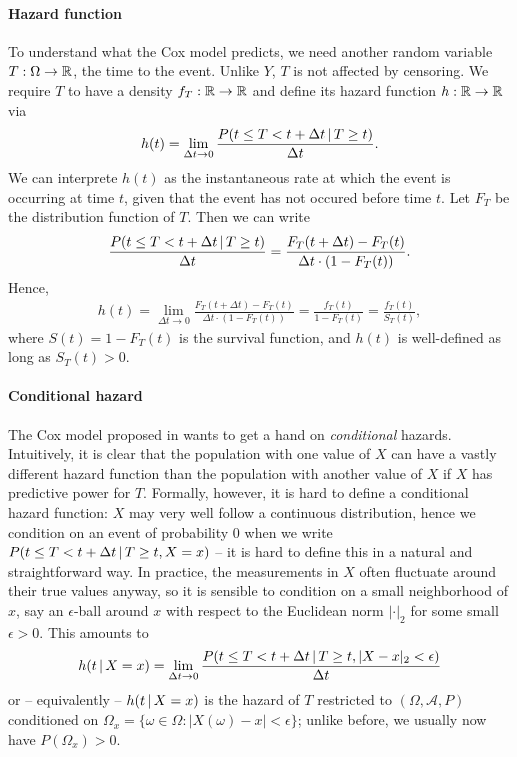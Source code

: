 \paragraph{Hazard function} To understand what the Cox model predicts, we need another random 
variable $T: \Omega \to \mathbb{R}$, the time to the event. Unlike $Y$, $T$ is not affected by censoring. 
We require $T$ to have a density $f_T: \mathbb{R} \to \mathbb{R}$ and define its hazard function $h: \mathbb{R} \to \mathbb{R}$
via
\begin{align}
    h(t) = \lim_{\Delta t \to 0} \frac{P(t \leq T < t + \Delta t \,|\, T \geq t)}{\Delta t}.
\end{align}
We can interprete $h(t)$ as the instantaneous rate at which the event is occurring at time $t$, 
given that the event has not occured before time $t$. Let $F_T$ be the distribution function of 
$T$. Then 
we can write
\begin{align}
    \frac{P(t \leq T < t + \Delta t \,|\, T \geq t)}{\Delta t} = 
    \frac{F_T(t + \Delta t) - F_T(t)}{\Delta t \cdot (1 - F_T(t))}.
\end{align}
Hence, 
\begin{align}
    h(t) = \lim_{\Delta t \to 0} \frac{F_T(t + \Delta t) - F_T(t)}{\Delta t \cdot (1 - F_T(t))} 
    = \frac{f_T(t)}{1 - F_T(t)} = \frac{f_T(t)}{S_T(t)},
\end{align}
where $S(t) = 1 - F_T(t)$ is the survival function, and $h(t)$ is well-defined as long as $S_T(t)
> 0$.

\paragraph{Conditional hazard} The Cox model proposed in \cite{cox72} wants to get a hand on 
\textit{conditional} hazards.
Intuitively, it is clear that the population with one value of $X$ can have a vastly different 
hazard function than the population with another value of $X$ if $X$ has predictive power for $T$.
Formally, however, it is hard to define a conditional hazard function: $X$ may very well 
follow a continuous distribution, hence we condition on an event of probability $0$ when we write 
$P(t \leq T < t + \Delta t \,|\, T \geq t, X = x)$ -- it is hard to define this in a natural
and straightforward way. In practice, the measurements in $X$ often fluctuate around their true 
values anyway, so it is sensible to condition on a small neighborhood of $x$, say an $\epsilon$-ball 
around $x$ with respect to the Euclidean norm $|\cdot|_2$ for some small $\epsilon > 0$. This 
amounts to
\begin{align}
    h(t \,|\, X = x) = \lim_{\Delta t \to 0} \frac{P(t \leq T < t + \Delta t \,|\, T \geq t, 
    |X - x|_2 < \epsilon)}{\Delta t}
\end{align}
or -- equivalently -- $h(t \,|\, X = x)$ is the hazard of $T$ restricted to $(\Omega, \mathcal{A}, 
P)$ conditioned on $\Omega_x = \{ \omega \in \Omega: |X(\omega) - x| < \epsilon \}$; unlike before, 
we usually now have $P(\Omega_x) > 0$.

